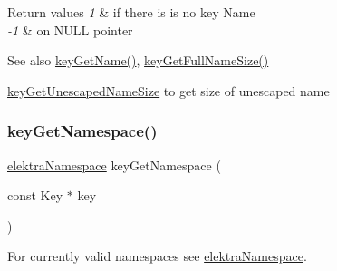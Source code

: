 \begin{DoxyRetVals}{Return values}
{\em 1} & if there is is no key Name \\
\hline
{\em -\/1} & on N\+U\+LL pointer \\
\hline
\end{DoxyRetVals}
\begin{DoxySeeAlso}{See also}
\hyperlink{group__keyname_gab29a850168d9b31c9529e90cf9ab68be}{key\+Get\+Name()}, \hyperlink{group__keyname_gab65dc9d43d3ee08d5e936a20ebbddd23}{key\+Get\+Full\+Name\+Size()} 

\hyperlink{group__keyname_ga5e7eff0c77678420199d0d2e8729152b}{key\+Get\+Unescaped\+Name\+Size} to get size of unescaped name 
\end{DoxySeeAlso}
\mbox{\label{group__keyname_gafc3ca03ed10f87eb59bdc02cf2a0de8d}} 
\subsubsection{\texorpdfstring{key\+Get\+Namespace()}{keyGetNamespace()}}
{\footnotesize\ttfamily \hyperlink{group__key_gaec3b8d6f430ae49b91bafe8a86310a68}{elektra\+Namespace} key\+Get\+Namespace (\begin{DoxyParamCaption}\item[{const Key $\ast$}]{key }\end{DoxyParamCaption})}



For currently valid namespaces see \hyperlink{group__key_gaec3b8d6f430ae49b91bafe8a86310a68}{elektra\+Namespace}. 

